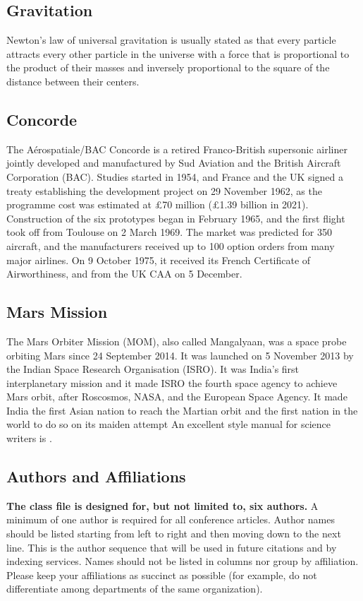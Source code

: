 \documentclass[conference]{IEEEtran}
\begin{document}
\subsection{Gravitation}


Newton's law of universal gravitation is usually stated as that every particle attracts every other particle in the universe with a force that is proportional to the product of their masses and inversely proportional to the square of the distance between their centers.


\subsection{Concorde}
The Aérospatiale/BAC Concorde is a retired Franco-British supersonic airliner jointly developed and manufactured by Sud Aviation and the British Aircraft Corporation (BAC). Studies started in 1954, and France and the UK signed a treaty establishing the development project on 29 November 1962, as the programme cost was estimated at £70 million (£1.39 billion in 2021). Construction of the six prototypes began in February 1965, and the first flight took off from Toulouse on 2 March 1969. The market was predicted for 350 aircraft, and the manufacturers received up to 100 option orders from many major airlines. On 9 October 1975, it received its French Certificate of Airworthiness, and from the UK CAA on 5 December.

\subsection{Mars Mission}\label{SCM}

The Mars Orbiter Mission (MOM), also called Mangalyaan, was a space probe orbiting Mars since 24 September 2014. It was launched on 5 November 2013 by the Indian Space Research Organisation (ISRO). It was India's first interplanetary mission and it made ISRO the fourth space agency to achieve Mars orbit, after Roscosmos, NASA, and the European Space Agency. It made India the first Asian nation to reach the Martian orbit and the first nation in the world to do so on its maiden attempt
An excellent style manual for science writers is \cite{b7}.

\subsection{Authors and Affiliations}
\textbf{The class file is designed for, but not limited to, six authors.} A 
minimum of one author is required for all conference articles. Author names 
should be listed starting from left to right and then moving down to the 
next line. This is the author sequence that will be used in future citations 
and by indexing services. Names should not be listed in columns nor group by 
affiliation. Please keep your affiliations as succinct as possible (for 
example, do not differentiate among departments of the same organization).
\end{document}

